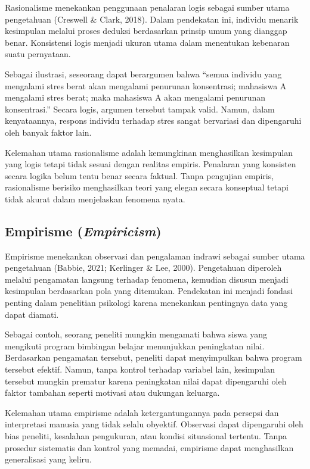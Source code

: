 \documentclass[
  indonesian,
  letterpaper,
  DIV=11,
  numbers=noendperiod]{scrreprt}
\begin{document}
Rasionalisme menekankan penggunaan penalaran logis sebagai sumber utama
pengetahuan (Creswell \& Clark, 2018). Dalam pendekatan ini, individu
menarik kesimpulan melalui proses deduksi berdasarkan prinsip umum yang
dianggap benar. Konsistensi logis menjadi ukuran utama dalam menentukan
kebenaran suatu pernyataan.

Sebagai ilustrasi, seseorang dapat berargumen bahwa ``semua individu
yang mengalami stres berat akan mengalami penurunan konsentrasi;
mahasiswa A mengalami stres berat; maka mahasiswa A akan mengalami
penurunan konsentrasi.'' Secara logis, argumen tersebut tampak valid.
Namun, dalam kenyataannya, respons individu terhadap stres sangat
bervariasi dan dipengaruhi oleh banyak faktor lain.

Kelemahan utama rasionalisme adalah kemungkinan menghasilkan kesimpulan
yang logis tetapi tidak sesuai dengan realitas empiris. Penalaran yang
konsisten secara logika belum tentu benar secara faktual. Tanpa
pengujian empiris, rasionalisme berisiko menghasilkan teori yang elegan
secara konseptual tetapi tidak akurat dalam menjelaskan fenomena nyata.

\subsection{\texorpdfstring{Empirisme
(\emph{Empiricism})}{Empirisme (Empiricism)}}\label{empirisme-empiricism}

Empirisme menekankan observasi dan pengalaman indrawi sebagai sumber
utama pengetahuan (Babbie, 2021; Kerlinger \& Lee, 2000). Pengetahuan
diperoleh melalui pengamatan langsung terhadap fenomena, kemudian
disusun menjadi kesimpulan berdasarkan pola yang ditemukan. Pendekatan
ini menjadi fondasi penting dalam penelitian psikologi karena menekankan
pentingnya data yang dapat diamati.

Sebagai contoh, seorang peneliti mungkin mengamati bahwa siswa yang
mengikuti program bimbingan belajar menunjukkan peningkatan nilai.
Berdasarkan pengamatan tersebut, peneliti dapat menyimpulkan bahwa
program tersebut efektif. Namun, tanpa kontrol terhadap variabel lain,
kesimpulan tersebut mungkin prematur karena peningkatan nilai dapat
dipengaruhi oleh faktor tambahan seperti motivasi atau dukungan
keluarga.

Kelemahan utama empirisme adalah ketergantungannya pada persepsi dan
interpretasi manusia yang tidak selalu obyektif. Observasi dapat
dipengaruhi oleh bias peneliti, kesalahan pengukuran, atau kondisi
situasional tertentu. Tanpa prosedur sistematis dan kontrol yang
memadai, empirisme dapat menghasilkan generalisasi yang keliru.
\end{document}
